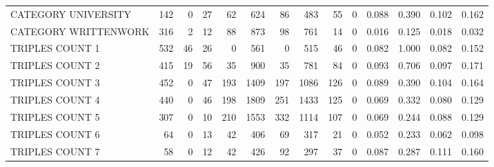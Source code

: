 \begin{tabular}{lrrrrrrrrrllll}
 CATEGORY UNIVERSITY      &             142 &             0 &              27 &              62 &             624 &   86 &  483 &   55 &    0 & 0.088 & 0.390 & 0.102 & 0.162 \\
 CATEGORY WRITTENWORK     &             316 &             2 &              12 &              88 &             873 &   98 &  761 &   14 &    0 & 0.016 & 0.125 & 0.018 & 0.032 \\
 TRIPLES COUNT 1          &             532 &            46 &              26 &               0 &             561 &    0 &  515 &   46 &    0 & 0.082 & 1.000 & 0.082 & 0.152 \\
 TRIPLES COUNT 2          &             415 &            19 &              56 &              35 &             900 &   35 &  781 &   84 &    0 & 0.093 & 0.706 & 0.097 & 0.171 \\
 TRIPLES COUNT 3          &             452 &             0 &              47 &             193 &            1409 &  197 & 1086 &  126 &    0 & 0.089 & 0.390 & 0.104 & 0.164 \\
 TRIPLES COUNT 4          &             440 &             0 &              46 &             198 &            1809 &  251 & 1433 &  125 &    0 & 0.069 & 0.332 & 0.080 & 0.129 \\
 TRIPLES COUNT 5          &             307 &             0 &              10 &             210 &            1553 &  332 & 1114 &  107 &    0 & 0.069 & 0.244 & 0.088 & 0.129 \\
 TRIPLES COUNT 6          &              64 &             0 &              13 &              42 &             406 &   69 &  317 &   21 &    0 & 0.052 & 0.233 & 0.062 & 0.098 \\
 TRIPLES COUNT 7          &              58 &             0 &              12 &              42 &             426 &   92 &  297 &   37 &    0 & 0.087 & 0.287 & 0.111 & 0.160 \\
\hline
\end{tabular}